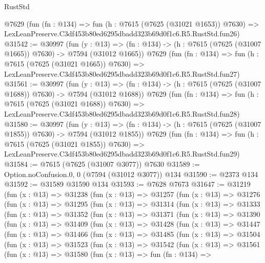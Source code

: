 \begin{lexlean}{RustStd}
\begin{coremodule}
    @7629
    (fun (fn : @134) =>
    fun (h : @7615 (@7625 (@31021 @1653)) @7630) =>
    LexLeanPreserve.C3df453b80ed6295dbadd323b69d0f1c6.R5.RustStd.fun26)
@31542 := @30997
    (fun (y : @13) =>
    (fn : @134) -> (h : @7615 (@7625 (@31007 @1665)) @7630) -> @7594 (@31012 @1665))
    @7629
    (fun (fn : @134) =>
    fun (h : @7615 (@7625 (@31021 @1665)) @7630) =>
    LexLeanPreserve.C3df453b80ed6295dbadd323b69d0f1c6.R5.RustStd.fun27)
@31561 := @30997
    (fun (y : @13) =>
    (fn : @134) -> (h : @7615 (@7625 (@31007 @1688)) @7630) -> @7594 (@31012 @1688))
    @7629
    (fun (fn : @134) =>
    fun (h : @7615 (@7625 (@31021 @1688)) @7630) =>
    LexLeanPreserve.C3df453b80ed6295dbadd323b69d0f1c6.R5.RustStd.fun28)
@31580 := @30997
    (fun (y : @13) =>
    (fn : @134) -> (h : @7615 (@7625 (@31007 @1855)) @7630) -> @7594 (@31012 @1855))
    @7629
    (fun (fn : @134) =>
    fun (h : @7615 (@7625 (@31021 @1855)) @7630) =>
    LexLeanPreserve.C3df453b80ed6295dbadd323b69d0f1c6.R5.RustStd.fun29)
@31584 := @7615 (@7625 (@31007 @3077)) @7630
@31589 := Option.noConfusion.{0, 0} (@7594 (@31012 @3077)) @134
@31590 := @2373 @134
@31592 := @31589 @31590 @134
@31593 := @7628 @7673
@31647 := @31219
    (fun (x : @13) =>
    @31238
      (fun (x : @13) =>
      @31257
        (fun (x : @13) =>
        @31276
          (fun (x : @13) =>
          @31295
            (fun (x : @13) =>
            @31314
              (fun (x : @13) =>
              @31333
                (fun (x : @13) =>
                @31352
                  (fun (x : @13) =>
                  @31371
                    (fun (x : @13) =>
                    @31390
                      (fun (x : @13) =>
                      @31409
                        (fun (x : @13) =>
                        @31428
                          (fun (x : @13) =>
                          @31447
                            (fun (x : @13) =>
                            @31466
                              (fun (x : @13) =>
                              @31485
                                (fun (x : @13) =>
                                @31504
                                  (fun (x : @13) =>
                                  @31523
                                    (fun (x : @13) =>
                                    @31542
                                      (fun (x : @13) =>
                                      @31561
                                        (fun (x : @13) =>
                                        @31580
                                          (fun (x : @13) =>
                                          fun (fn : @134) =>

\end{coremodule}
\end{lexlean}
